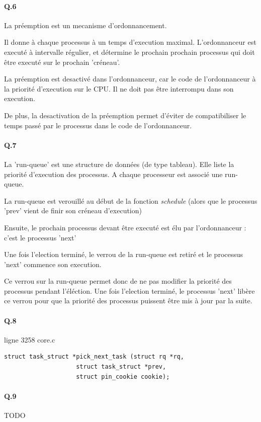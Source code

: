 \documentclass[10pt]{article}
\begin{document}
\paragraph{Q.6}
La préemption est un mecanisme d'ordonnancement.

Il donne à chaque processus à un temps d'execution maximal. \label{preempt}
L'ordonnanceur est executé à intervalle régulier, et détermine le prochain prochain
processus qui doit être executé sur le prochain 'créneau'.

La préemption est desactivé dans l'ordonnanceur, car le code de l'ordonnanceur à la priorité d'execution sur le CPU.
Il ne doit pas être interrompu dans son execution.

De plus, la desactivation de la préemption permet d'éviter de compatibiliser
le temps passé par le processus dans le code de l'ordonnanceur.

 \paragraph{Q.7}
 La 'run-queue' est une structure de données (de type tableau). Elle liste la priorité d'execution des processus.
 A chaque processeur est associé une run-queue.
 
 La run-queue est verouillé au début de la fonction \textit{schedule} (alors que le processus 'prev' vient de finir son créneau d'execution)
 
 Ensuite, le prochain processus devant être executé est élu par l'ordonnanceur : c'est le processus 'next'
 
 Une fois l'election terminé, le verrou de la run-queue est retiré et le processus 'next' commence son execution.
 
 Ce verrou sur la run-queue permet donc de ne pas modifier la priorité des processus pendant l'éléction.
 Une fois l'election terminé, le processus 'next' libère ce verrou pour que la priorité des processus puissent être mis à jour par la suite.
 
\paragraph{Q.8} ligne 3258 core.c
\lstset{language=C}
\begin{lstlisting}[frame=single]
struct task_struct *pick_next_task (struct rq *rq,
				    struct task_struct *prev,
				    struct pin_cookie cookie);
\end{lstlisting}

 \paragraph{Q.9} TODO
 
\end{document}
